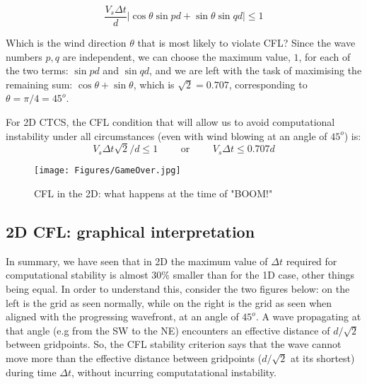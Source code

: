 	
	\begin{equation}
		\frac{ V_s\Delta t}{d}  \left | \cos \theta \sin pd + \sin \theta \sin qd \right | \leq 1
	\end{equation}
	
	Which is the wind direction $\theta$ that is most likely to violate CFL? Since the wave numbers $p,q$ are independent, we can choose the maximum value, $1$, for each of the two terms: $\sin pd$ and $\sin qd$, and we are left with the task of maximising the remaining sum: $\cos \theta + \sin \theta$, which is $\sqrt{2}=0.707$, corresponding to $\theta=\pi/4=45^o$.


\begin{definition}
	For 2D CTCS, the CFL condition that will allow us to avoid computational instability under all circumstances (even with wind blowing at an angle of $45^o$) is: 
	\begin{equation}
		V_s \Delta t \sqrt{2} / d \leq 1 \textrm{   ~~~~~      or     ~~~~~  } V_s \Delta t \leq 0.707 d 
	\end{equation}
\end{definition}


\begin{figure}[h!]
	\begin{center}
		\texttt{[image: Figures/GameOver.jpg]}
		\caption{CFL in the 2D: what happens at the time of "BOOM!"}
	\end{center}
\end{figure}	

	
\subsection{2D CFL: graphical interpretation}

	In summary, we have seen that in 2D the maximum value of $\Delta t$ required for computational stability is almost 30\% smaller than for the 1D case, other things being equal. In order to understand this, consider the two figures below: on the left is the grid as seen normally, while on the right is the grid as seen when aligned with the progressing wavefront, at an angle of $45^o$.
	A wave propagating at that angle (e.g from the SW to the NE) encounters an effective distance of $d/\sqrt{2}$ between gridpoints. So, the CFL stability criterion says that the wave cannot move more than the effective distance between gridpoints ($d/\sqrt{2}$ at its shortest) during time $\Delta t$, without incurring computatational instability.
	

